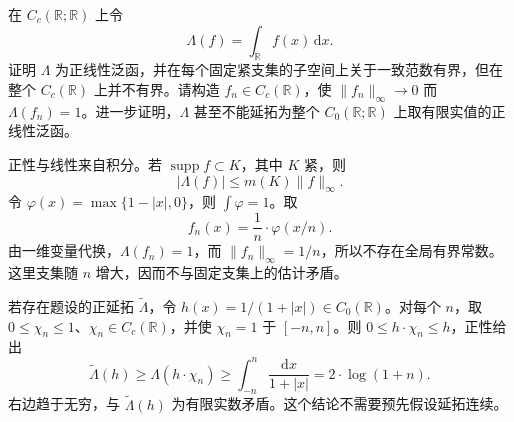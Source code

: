 \begin{exercise}\label{b1:ex:11-positive-unbounded}
在 \(C_c(\mathbb R;\mathbb R)\) 上令
\[
 \Lambda(f)=\int_{\mathbb R}f(x)\,\mathrm dx.
\]
证明 \(\Lambda\) 为正线性泛函，并在每个固定紧支集的子空间上关于一致范数有界，但在整个 \(C_c(\mathbb R)\) 上并不有界。请构造 \(f_n\in C_c(\mathbb R)\)，使 \(\|f_n\|_\infty\rightarrow0\) 而 \(\Lambda(f_n)=1\)。进一步证明，\(\Lambda\) 甚至不能延拓为整个 \(C_0(\mathbb R;\mathbb R)\) 上取有限实值的正线性泛函。
\end{exercise}
\begin{solution}
正性与线性来自积分。若 \(\operatorname{supp}f\subset K\)，其中 \(K\) 紧，则
\[
 |\Lambda(f)|\le m(K)\|f\|_\infty.
\]
令 \(\varphi(x)=\max\{1-|x|,0\}\)，则 \(\int\varphi=1\)。取
\[
 f_n(x)=\frac1n\cdot \varphi(x/n).
\]
由一维变量代换，\(\Lambda(f_n)=1\)，而 \(\|f_n\|_\infty=1/n\)，所以不存在全局有界常数。这里支集随 \(n\) 增大，因而不与固定支集上的估计矛盾。

若存在题设的正延拓 \(\widetilde\Lambda\)，令 \(h(x)=1/(1+|x|)\in C_0(\mathbb R)\)。对每个 \(n\)，取 \(0\le\chi_n\le1\)、\(\chi_n\in C_c(\mathbb R)\)，并使 \(\chi_n=1\) 于 \([-n,n]\)。则 \(0\le h\cdot \chi_n\le h\)，正性给出
\[
 \widetilde\Lambda(h)\ge\Lambda(h\cdot \chi_n)
 \ge\int_{-n}^n\frac{\mathrm dx}{1+|x|}
 =2\cdot \log(1+n).
\]
右边趋于无穷，与 \(\widetilde\Lambda(h)\) 为有限实数矛盾。这个结论不需要预先假设延拓连续。
\end{solution}

